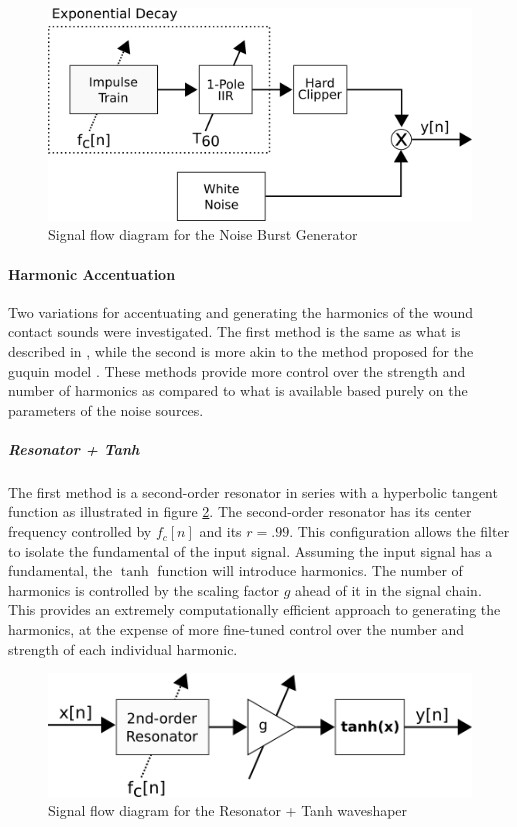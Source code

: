 \documentclass[../main.tex]{subfiles}
\begin{document}
\begin{figure}[h]
    \centering
    \includegraphics[scale=.5]{./images/diagrams/NoiseBurstGen.png}
    \caption{Signal flow diagram for the Noise Burst Generator}
    \label{fig:NoiseBurstGen}
\end{figure}

\paragraph{Harmonic Accentuation}
Two variations for accentuating and generating the harmonics of the wound contact sounds were investigated. The first method is the same as what is described in , while the second is more akin to the method proposed for the guquin model . These methods provide more control over the strength and number of harmonics as compared to what is available based purely on the parameters of the noise sources.

\subparagraph{Resonator + Tanh}
The first method is a second-order resonator in series with a hyperbolic tangent function as illustrated in figure \ref{fig:ResoTanh}. The second-order resonator has its center frequency controlled by $f_c[n]$ and its $r = .99$. This configuration allows the filter to isolate the fundamental of the input signal. Assuming the input signal has a fundamental, the $\tanh$ function will introduce harmonics. The number of harmonics is controlled by the scaling factor $g$ ahead of it in the signal chain. This provides an extremely computationally efficient approach to generating the harmonics, at the expense of more fine-tuned control over the number and strength of each individual harmonic.

\begin{figure}[h]
    \centering
    \includegraphics[scale=.5]{./images/diagrams/ResoTanh.png}
    \caption{Signal flow diagram for the Resonator + Tanh waveshaper}
    \label{fig:ResoTanh}
\end{figure}
\end{document}
